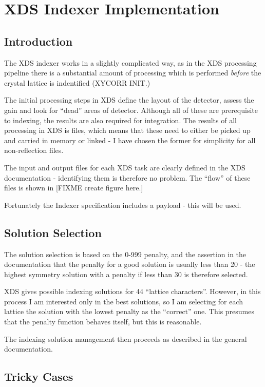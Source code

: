 \documentclass[a4paper, 11pt]{article}
\begin{document}
\section{XDS Indexer Implementation}

\subsection{Introduction}

The XDS indexer works in a slightly complicated way, as in the XDS processing
pipeline there is a substantial amount of processing which is performed 
\emph{before} the crystal lattice is indentified (XYCORR INIT.)

The initial processing steps in XDS define the layout of the detector, assess
the gain and look for ``dead'' areas of detector. Although all of these are
prerequisite to indexing, the results are also required for integration.
The results of all processing in XDS is files, which means that these 
need to either be picked up and carried in memory or linked - I have chosen the
former for simplicity for all non-reflection files.

The input and output files for each XDS task are clearly defined in the XDS
documentation - identifying them is therefore no problem. The ``flow'' of
these files is shown in [FIXME create figure here.]

Fortunately the Indexer specification includes a payload - this will be used.

\subsection{Solution Selection}

The solution selection is based on the 0-999 penalty, and the assertion in
the documentation that the penalty for a good solution is usually less than
20 - the highest symmetry solution with a penalty if less than 30 is therefore
selected.

XDS gives possible indexing solutions for 44 ``lattice characters''. However, 
in this process I am interested only in the best solutions, so I am selecting
for each lattice the solution with the lowest penalty as the ``correct'' one.
This presumes that the penalty function behaves itself, but this is reasonable.

The indexing solution management then proceeds as described in the general
documentation.

\subsection{Tricky Cases}
\end{document}
